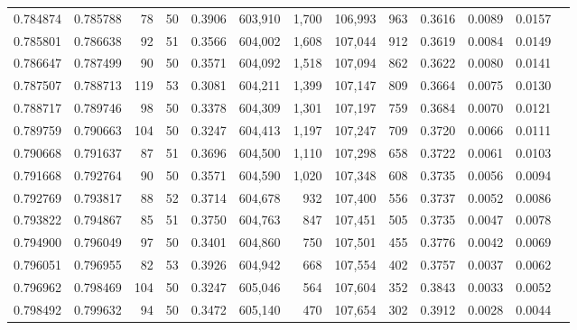 \begin{tabular}{rrrrrrrrrrrrr}
0.784874 & 0.785788 &    78 &  50 &                                     0.3906 & 603,910 &   1,700 & 106,993 &     963 & 0.3616 & 0.0089 & 0.0157 \\
0.785801 & 0.786638 &    92 &  51 &                                     0.3566 & 604,002 &   1,608 & 107,044 &     912 & 0.3619 & 0.0084 & 0.0149 \\
0.786647 & 0.787499 &    90 &  50 &                                     0.3571 & 604,092 &   1,518 & 107,094 &     862 & 0.3622 & 0.0080 & 0.0141 \\
0.787507 & 0.788713 &   119 &  53 &                                     0.3081 & 604,211 &   1,399 & 107,147 &     809 & 0.3664 & 0.0075 & 0.0130 \\
0.788717 & 0.789746 &    98 &  50 &                                     0.3378 & 604,309 &   1,301 & 107,197 &     759 & 0.3684 & 0.0070 & 0.0121 \\
0.789759 & 0.790663 &   104 &  50 &                                     0.3247 & 604,413 &   1,197 & 107,247 &     709 & 0.3720 & 0.0066 & 0.0111 \\
0.790668 & 0.791637 &    87 &  51 &                                     0.3696 & 604,500 &   1,110 & 107,298 &     658 & 0.3722 & 0.0061 & 0.0103 \\
0.791668 & 0.792764 &    90 &  50 &                                     0.3571 & 604,590 &   1,020 & 107,348 &     608 & 0.3735 & 0.0056 & 0.0094 \\
0.792769 & 0.793817 &    88 &  52 &                                     0.3714 & 604,678 &     932 & 107,400 &     556 & 0.3737 & 0.0052 & 0.0086 \\
0.793822 & 0.794867 &    85 &  51 &                                     0.3750 & 604,763 &     847 & 107,451 &     505 & 0.3735 & 0.0047 & 0.0078 \\
0.794900 & 0.796049 &    97 &  50 &                                     0.3401 & 604,860 &     750 & 107,501 &     455 & 0.3776 & 0.0042 & 0.0069 \\
0.796051 & 0.796955 &    82 &  53 &                                     0.3926 & 604,942 &     668 & 107,554 &     402 & 0.3757 & 0.0037 & 0.0062 \\
0.796962 & 0.798469 &   104 &  50 &                                     0.3247 & 605,046 &     564 & 107,604 &     352 & 0.3843 & 0.0033 & 0.0052 \\
0.798492 & 0.799632 &    94 &  50 &                                     0.3472 & 605,140 &     470 & 107,654 &     302 & 0.3912 & 0.0028 & 0.0044 \\

\end{tabular}
